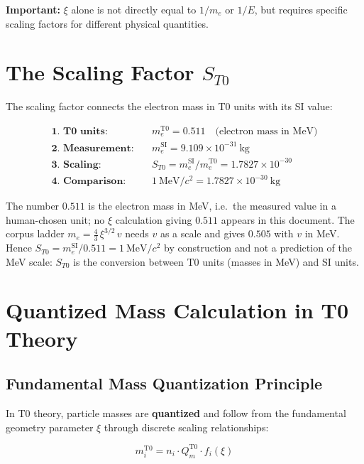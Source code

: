 	\textbf{Important:} $\xi$ alone is not directly equal to $1/m_e$ or $1/E$, but requires specific scaling factors for different physical quantities.
	
	\section{The Scaling Factor $S_{T0}$}
	\label{sec:scaling-derivation}
	
	The scaling factor connects the electron mass in T0 units with its SI value:
	
	\begin{align}
		\textbf{1. T0 units:} \quad & m_e^{\mathrm{T0}} = 0.511 \quad \text{(electron mass in MeV)} \\
		\textbf{2. Measurement:} \quad & m_e^{\mathrm{SI}} = 9.109 \times 10^{-31}~\mathrm{kg} \\
		\textbf{3. Scaling:} \quad & S_{T0} = m_e^{\mathrm{SI}}/m_e^{\mathrm{T0}} = 1.7827\!\times\!10^{-30} \\
		\textbf{4. Comparison:} \quad & 1~\mathrm{MeV}/c^2 = 1.7827 \times 10^{-30}~\mathrm{kg}
	\end{align}
	
	The number $0.511$ is the electron mass in MeV, i.e.\ the measured value in a human-chosen unit; no $\xi$ calculation giving $0.511$ appears in this document. The corpus ladder $m_e = \frac43\,\xi^{3/2}\,v$ needs $v$ as a scale and gives $0.505$ with $v$ in MeV. Hence $S_{T0} = m_e^{\mathrm{SI}}/0.511 = 1~\mathrm{MeV}/c^2$ by construction and not a prediction of the MeV scale: $S_{T0}$ is the conversion between T0 units (masses in MeV) and SI units.
	
	\section{Quantized Mass Calculation in T0 Theory}
	
	\subsection{Fundamental Mass Quantization Principle}
	
	In T0 theory, particle masses are \textbf{quantized} and follow from the fundamental geometry parameter $\xi$ through discrete scaling relationships:
	
	\begin{equation}
		m_i^{\mathrm{T0}} = n_i \cdot Q_m^{\mathrm{T0}} \cdot f_i(\xi)
	\end{equation}
	
